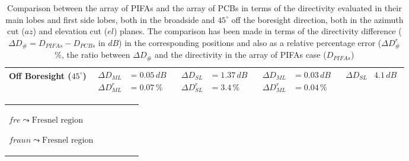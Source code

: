 \documentclass[10 pt,a4paper,twocolumn]{article}
\begin{document}
{\begin{table}[bt!]
\begin{center}
{\begin{tabular}{|m{3cm}|m{3.4cm}|m{3.4cm}|m{3.4cm}|m{3.4cm}|}
				\hline 
				Off Boresight ($45^\circ$) & 	
				$\begin{aligned}
					\Delta D_{ML}&=0.05\,dB\\
					\Delta D_{ML}^r&=0.07\,\%	
				\end{aligned}$
			& 	$\begin{aligned}
				\Delta D_{SL}&=1.37\,dB\\
				\Delta D_{SL}^r&=3.4\,\%\end{aligned}$
			& $\begin{aligned}
				\Delta D_{ML}&=0.03\,dB\\
			\Delta D_{ML}^r&=0.04\,\%\end{aligned}$	 
		& $\begin{aligned}
			\Delta D_{SL}&4.1\,dB\\
	\end{aligned}$	  \\
				\hline
		\end{tabular}}
		\caption{Comparison between the array of PIFAs and the array of PCBs in terms of the directivity evaluated in their main lobes and first side lobes, both in the broadside and $45^\circ$ off the boresight direction, both in the azimuth cut ($az$) and elevation cut ($el$) planes. The comparison has been made in terms of the directivity difference ($\Delta D_{\#}=D_{PIFAs}-D_{PCBs}$ in $dB$) in the corresponding positions and also as a relative percentage error ($\Delta D^r_{\#}$\%, the ratio between $\Delta D_{\#}$ and the directivity in the array of PIFAs case ($D_{PIFAs}$)}
		\label{table:array comparison error}
	\end{center}
\end{table}
\begin{table}[bt!]
	\begin{center}
			\small{\begin{tabular}{|m{4cm}|m{2.6cm}|m{2cm}|m{2cm}|m{2.3cm}|m{2.3cm}|}
		
				\hline
				$fre\leadsto\text{Fresnel region}$ 
							
				$fraun\leadsto\text{Fresnel region}$
			

\end{tabular}}
\end{center}
\end{table}}
\end{document}
